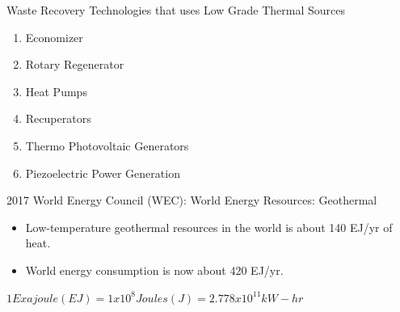 \begin{frame}{Waste Recovery Technologies that uses Low Grade Thermal Sources\cite{jouhara2018waste}}
    \begin{enumerate}
        \item Economizer
        \item Rotary Regenerator
        \item Heat Pumps
        \item Recuperators
        \item Thermo Photovoltaic Generators
        \item Piezoelectric Power Generation
    \end{enumerate}
\end{frame}

\begin{frame}{2017 World Energy Council (WEC): World Energy Resources: Geothermal\cite{council2017world,WorldEnergyCouncil2013}}
\begin{itemize}
    \item Low-temperature geothermal resources in the world is about 140 EJ/yr of heat.
    \item World energy consumption is now about 420 EJ/yr.
\end{itemize}
$ 1 Exajoule (EJ) = 1 x 10^{8} Joules (J) = 2.778 x 10^{11} kW-hr$
\end{frame}

